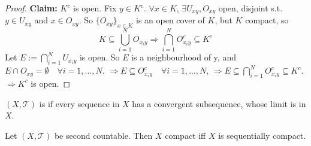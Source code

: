\begin{proof}
    \textbf{Claim:} $K^c$ is open.
    \newline \noindent Fix $y \in K^c$. $\forall x \in K$, $\exists U_{xy}, O_{xy}$ open, disjoint
    s.t. $y \in U_{xy}$ and $x \in O_{xy}$. So $\{O_{xy}\}_{x \in K}$ is an open cover of $K$, but
    $K $ compact, so 
    \[
        K \subseteq \bigcup_{i=1}^{N} O_{x_i y} \Rightarrow 
        \bigcap_{i=1}^{N} O_{x_i y}^c \subseteq K^c
    \]         
    Let $E := \bigcap_{i=1}^N U_{x_i y}$ is open. So $E$ is a neighbourhood of y, and 
    $E \cap O_{xy} = \emptyset \quad \forall i = 1, \dots, N$. $\Rightarrow E \subseteq O_{x_i y}^c
    \quad \forall i = 1, \dots, N$, $\Rightarrow E \subseteq \bigcap_{i = 1}^N O_{x_i y}^c \subseteq 
    K^c$. $\Rightarrow K^c $ is open. \qedhere 
\end{proof}

\begin{defn} 
    $(X, \mathcal{T})$ is  if every sequence in $X$ has a convergent 
    subsequence, whose limit is in $X$.    
\end{defn}

\begin{prop}
    Let $(X, \mathcal{T})$ be second countable. Then $X$ compact iff $X$ is sequentially compact.  
\end{prop}


